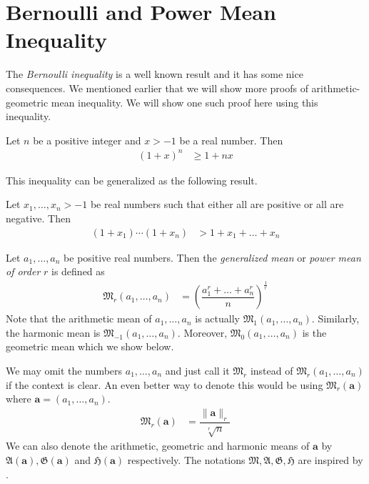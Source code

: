 \documentclass{subfile}
\begin{document}
	\section{Bernoulli and Power Mean Inequality}\label{sec:powermean}
	The \emph{Bernoulli inequality} is a well known result and it has some nice consequences. We mentioned earlier that we will show more proofs of arithmetic-geometric mean inequality. We will show one such proof here using this inequality.
		\begin{theorem}
			Let $n$ be a positive integer and $x>-1$ be a real number. Then
				\begin{align*}
					(1+x)^{n}
						& \geq1+nx
				\end{align*}
		\end{theorem}
	This inequality can be generalized as the following result.
		\begin{theorem}
			Let $x_{1},\ldots,x_{n}>-1$ be real numbers such that either all are positive or all are negative. Then
				\begin{align*}
					(1+x_{1})\cdots(1+x_{n})
						& > 1+x_{1}+\ldots+x_{n}
				\end{align*}
		\end{theorem}%
	Let $a_{1},\ldots,a_{n}$ be positive real numbers. Then the \emph{generalized mean} or \emph{power mean of order} $r$ is defined as
		\begin{align*}
			\mathfrak{M}_{r}(a_{1},\ldots,a_{n})
				& = \left(\dfrac{a_{1}^{r}+\ldots+a_{n}^{r}}{n}\right)^{\frac{1}{r}}
		\end{align*}
	Note that the arithmetic mean of $a_{1},\ldots,a_{n}$ is actually $\mathfrak{M}_{1}(a_{1},\ldots,a_{n})$. Similarly, the harmonic mean is $\mathfrak{M}_{-1}(a_{1},\ldots,a_{n})$. Moreover, $\mathfrak{M}_0(a_{1},\ldots,a_{n})$ is the geometric mean which we show below.
	
	We may omit the numbers $a_{1},\ldots,a_{n}$ and just call it $\mathfrak{M}_{r}$ instead of $\mathfrak{M}_{r}(a_{1},\ldots,a_{n})$ if the context is clear. An even better way to denote this would be using $\mathfrak{M}_{r}(\mathbf{a})$ where $\mathbf{a}=(a_{1},\ldots,a_{n})$.
		\begin{align*}
			\mathfrak{M}_{r}(\mathbf{a})
				& = \dfrac{\|\mathbf{a}\|_{r}}{\sqrt[r]{n}}
		\end{align*}
	We can also denote the arithmetic, geometric and harmonic means of $\mathbf{a}$ by $\mathfrak{A}(\mathbf{a}),\mathfrak{G}(\mathbf{a})$ and $\mathfrak{H}(\mathbf{a})$ respectively. The notations $\mathfrak{M},\mathfrak{A},\mathfrak{G},\mathfrak{H}$ are inspired by \textcite{hardy_littlewood_polya_1934}. 
	
\end{document}

